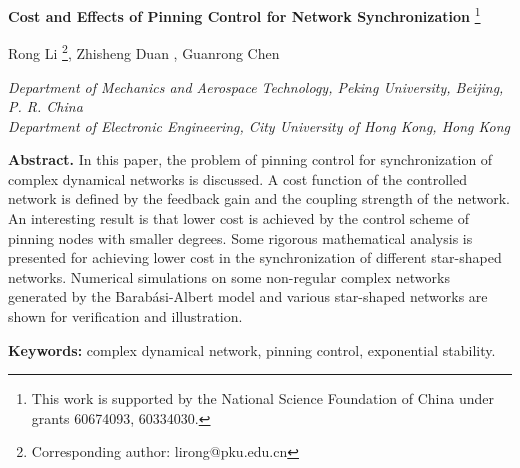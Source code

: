 \documentclass[11pt]{article}
\begin{document}
\begin{center}
{{\Large \bf Cost and Effects of Pinning Control for Network
Synchronization}}
 \footnote{
{\footnotesize This work is supported by the National
 Science Foundation of
 China under grants 60674093, 60334030.}}
\end{center}
\vskip 0.2cm
\begin{center}
 Rong Li  \footnote{ {\footnotesize Corresponding
author: lirong@pku.edu.cn}},
  \quad Zhisheng Duan ,
  \quad Guanrong Chen 
 \end{center}
\begin{center}
{\small \it   Department of Mechanics and Aerospace
Technology, Peking University, Beijing, P. R. China
\\  Department of Electronic Engineering, City University of Hong Kong, Hong Kong}
\end{center}

\vspace*{1\baselineskip}
\begin{center}
{\begin{minipage}{127mm} {\small {\bf Abstract.} In this paper, the
problem of pinning control for synchronization of complex dynamical
networks is discussed. A cost function of the controlled network is
defined by the feedback gain and the coupling strength of the
network. An interesting result is that lower cost is achieved by the
control scheme of pinning nodes with smaller degrees. Some rigorous
mathematical analysis is presented for achieving lower cost in the
synchronization of different star-shaped networks. Numerical
simulations on some non-regular complex networks generated by the
Barab\'{a}si-Albert model and various star-shaped networks are shown
for verification and illustration.}

\vspace*{0.5\baselineskip} {{\bf Keywords:}
 complex dynamical network, pinning control, exponential stability.}

\end{minipage}
}
\end{center}

\abovedisplayskip=0.13cm \abovedisplayshortskip=0.06cm
\belowdisplayskip=0.13cm \belowdisplayshortskip=0.08cm

\def\dis{\displaystyle}
\end{document}
